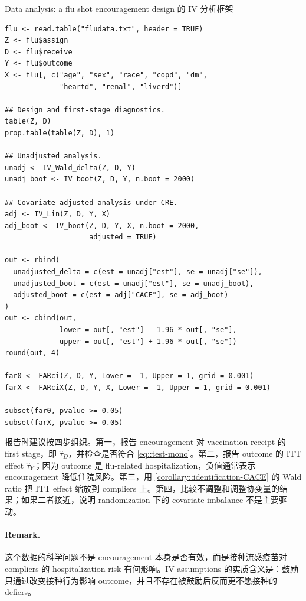 \begin{exercisesolution}{Data analysis: a flu shot encouragement design \citep{mcdonald1992effects}}{ 的 IV 分析框架}
\begin{lstlisting}
flu <- read.table("fludata.txt", header = TRUE)
Z <- flu$assign
D <- flu$receive
Y <- flu$outcome
X <- flu[, c("age", "sex", "race", "copd", "dm",
             "heartd", "renal", "liverd")]

## Design and first-stage diagnostics.
table(Z, D)
prop.table(table(Z, D), 1)

## Unadjusted analysis.
unadj <- IV_Wald_delta(Z, D, Y)
unadj_boot <- IV_boot(Z, D, Y, n.boot = 2000)

## Covariate-adjusted analysis under CRE.
adj <- IV_Lin(Z, D, Y, X)
adj_boot <- IV_boot(Z, D, Y, X, n.boot = 2000,
                    adjusted = TRUE)

out <- rbind(
  unadjusted_delta = c(est = unadj["est"], se = unadj["se"]),
  unadjusted_boot = c(est = unadj["est"], se = unadj_boot),
  adjusted_boot = c(est = adj["CACE"], se = adj_boot)
)
out <- cbind(out,
             lower = out[, "est"] - 1.96 * out[, "se"],
             upper = out[, "est"] + 1.96 * out[, "se"])
round(out, 4)

far0 <- FARci(Z, D, Y, Lower = -1, Upper = 1, grid = 0.001)
farX <- FARciX(Z, D, Y, X, Lower = -1, Upper = 1, grid = 0.001)

subset(far0, pvalue >= 0.05)
subset(farX, pvalue >= 0.05)
\end{lstlisting}

报告时建议按四步组织。第一，报告 encouragement 对 vaccination receipt 的 first stage，即 $\hat{\tau}_D$，并检查是否符合 \cref{eq::test-mono}。第二，报告 outcome 的 ITT effect $\hat{\tau}_Y$；因为 outcome 是 flu-related hospitalization，负值通常表示 encouragement 降低住院风险。第三，用 \cref{corollary::identification-CACE} 的 Wald ratio 把 ITT effect 缩放到 compliers 上。第四，比较不调整和调整协变量的结果；如果二者接近，说明 randomization 下的 covariate imbalance 不是主要驱动。

\paragraph{Remark.}
这个数据的科学问题不是 encouragement 本身是否有效，而是接种流感疫苗对 compliers 的 hospitalization risk 有何影响。IV assumptions 的实质含义是：鼓励只通过改变接种行为影响 outcome，并且不存在被鼓励后反而更不愿接种的 defiers。
\end{exercisesolution}

